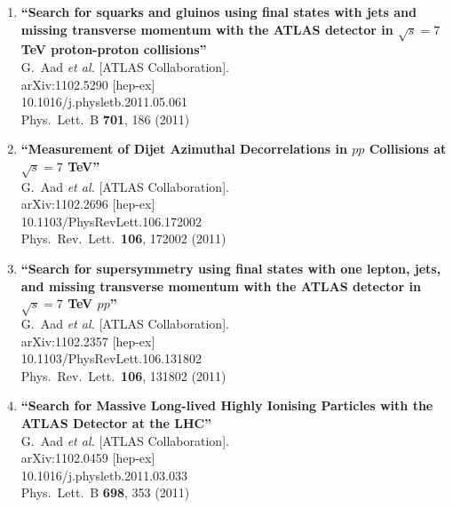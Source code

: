 \documentclass{article}
\begin{document}
\begin{enumerate}
\item%
{\bf ``Search for squarks and gluinos using final states with jets and missing transverse momentum with the ATLAS detector in $\sqrt{s}=7$ TeV proton-proton collisions''}
  \\{}G.~Aad {\it et al.}  [ATLAS Collaboration].
  \\{}arXiv:1102.5290 [hep-ex]
    \\{}10.1016/j.physletb.2011.05.061
\\{}Phys.\ Lett.\ B {\bf 701}, 186 (2011) %


\item%
{\bf ``Measurement of Dijet Azimuthal Decorrelations in $pp$ Collisions at $\sqrt{s}=7$ TeV''}
  \\{}G.~Aad {\it et al.}  [ATLAS Collaboration].
  \\{}arXiv:1102.2696 [hep-ex]
    \\{}10.1103/PhysRevLett.106.172002
\\{}Phys.\ Rev.\ Lett.\  {\bf 106}, 172002 (2011) %


\item%
{\bf ``Search for supersymmetry using final states with one lepton, jets, and missing transverse momentum with the ATLAS detector in $\sqrt{s}=7$ TeV $pp$''}
  \\{}G.~Aad {\it et al.}  [ATLAS Collaboration].
  \\{}arXiv:1102.2357 [hep-ex]
    \\{}10.1103/PhysRevLett.106.131802
\\{}Phys.\ Rev.\ Lett.\  {\bf 106}, 131802 (2011) %


\item%
{\bf ``Search for Massive Long-lived Highly Ionising Particles with the ATLAS Detector at the LHC''}
  \\{}G.~Aad {\it et al.}  [ATLAS Collaboration].
  \\{}arXiv:1102.0459 [hep-ex]
    \\{}10.1016/j.physletb.2011.03.033
\\{}Phys.\ Lett.\ B {\bf 698}, 353 (2011) %



\end{enumerate}
\end{document}

